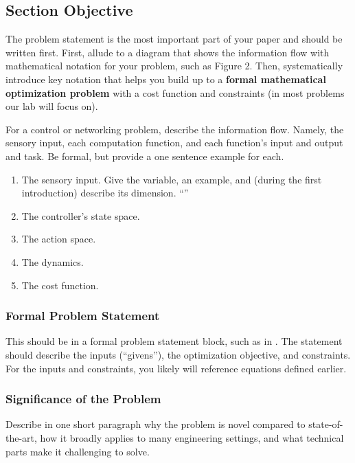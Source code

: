 \subsection{Section Objective}
The problem statement is the most important part of your paper and should be written first. First, allude to a diagram that shows the information flow with mathematical notation for your problem, such as Figure 2.
Then, systematically introduce key notation that helps you build up to a \textbf{formal mathematical optimization problem} with a cost function and constraints (in most problems our lab will focus on).

For a control or networking problem, describe the information flow. 
Namely, the sensory input, each computation function, and each function's input and output and task. Be formal, but provide a one sentence example for each.

\begin{enumerate}
    \item The sensory input.  Give the variable, an example,  and (during the first introduction) describe its dimension. ``''
    \item The controller's state space.
    \item The action space.
    \item The dynamics.
    \item The cost function.
\end{enumerate}

\subsubsection{Formal Problem Statement}
This should be in a formal problem statement block, such as in \cite{cheng2021data,nakanoya2021task}.
The statement should describe the inputs (``givens''), the optimization objective, and constraints. For the inputs and constraints, you likely will reference equations defined earlier. 

\subsubsection{Significance of the Problem}
Describe in one short paragraph why the problem is novel compared to state-of-the-art, how it broadly applies to many engineering settings, and what technical parts make it challenging to solve.

